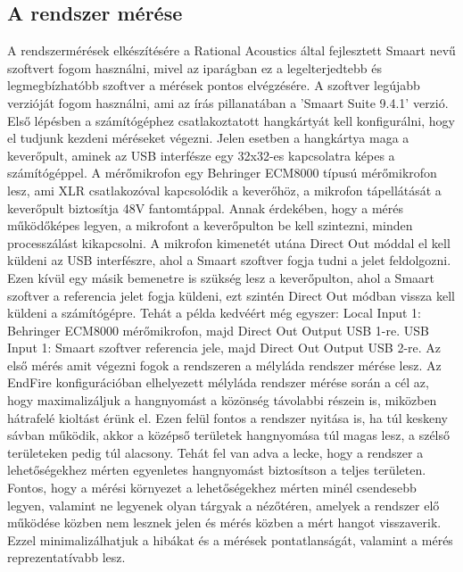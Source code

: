 \subsection{A rendszer mérése}
A rendszermérések elkészítésére a Rational Acoustics által fejlesztett Smaart nevű szoftvert fogom használni, mivel
az iparágban ez a legelterjedtebb és legmegbízhatóbb szoftver a mérések pontos elvégzésére.
A szoftver legújabb verzióját fogom használni, ami az írás pillanatában a 'Smaart Suite 9.4.1' verzió.
Első lépésben a számítógéphez csatlakoztatott hangkártyát kell konfigurálni, hogy el tudjunk kezdeni méréseket végezni.
Jelen esetben a hangkártya maga a keverőpult, aminek az USB interfésze egy 32x32-es kapcsolatra képes a számítógéppel.
A mérőmikrofon egy Behringer ECM8000 típusú mérőmikrofon lesz, ami XLR csatlakozóval kapcsolódik a keverőhöz, a mikrofon tápellátását
a keverőpult biztosítja 48V fantomtáppal. Annak érdekében, hogy a mérés működőképes legyen, a mikrofont a keverőpulton be kell szintezni, minden 
processzálást kikapcsolni. A mikrofon kimenetét utána Direct Out móddal el kell küldeni az USB interfészre, ahol a Smaart szoftver
fogja tudni a jelet feldolgozni. Ezen kívül egy másik bemenetre is szükség lesz a keverőpulton, ahol a Smaart szoftver a referencia jelet fogja
küldeni, ezt szintén Direct Out módban vissza kell küldeni a számítógépre.
Tehát a példa kedvéért még egyszer:
Local Input 1: Behringer ECM8000 mérőmikrofon, majd Direct Out Output USB 1-re.
USB Input 1: Smaart szoftver referencia jele, majd Direct Out Output USB 2-re.
Az első mérés amit végezni fogok a rendszeren a mélyláda rendszer mérése lesz.
Az EndFire konfigurációban elhelyezett mélyláda rendszer mérése során a cél az, hogy maximalizáljuk a hangnyomást a közönség távolabbi részein is,
miközben hátrafelé kioltást érünk el. Ezen felül fontos a rendszer nyitása is, ha túl keskeny sávban működik, akkor a középső területek
hangnyomása túl magas lesz, a szélső területeken pedig túl alacsony. Tehát fel van adva a lecke, hogy a rendszer a lehetőségekhez mérten
egyenletes hangnyomást biztosítson a teljes területen.
Fontos, hogy a mérési környezet a lehetőségekhez mérten minél csendesebb legyen, valamint
ne legyenek olyan tárgyak a nézőtéren, amelyek a rendszer elő működése közben
nem lesznek jelen és mérés közben a mért hangot visszaverik. Ezzel minimalizálhatjuk a
hibákat és a mérések pontatlanságát, valamint a mérés reprezentatívabb lesz.
